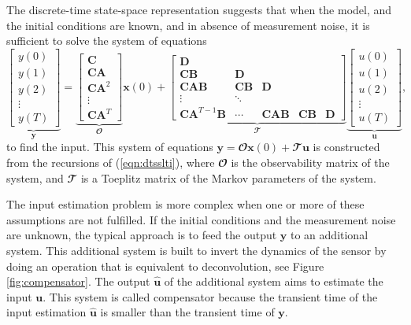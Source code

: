 The discrete-time state-space representation suggests that when the model, and the initial conditions are known, and in absence of measurement noise, it is sufficient to solve the system of equations 
\begin{equation} 
\underbrace{ \begin{bmatrix} y(0) \\ y(1) \\ y(2) \\ \vdots \\ y(T) \end{bmatrix} }_{\mathbf{y}}
 = \underbrace{ \begin{bmatrix} \mathbf{C} \\ \mathbf{C} \mathbf{A} \\ \mathbf{C} \mathbf{A}^2 \\ \vdots \\ \mathbf{C} \mathbf{A}^T \end{bmatrix} }_{\mathbfcal{O}} \mathbf{x}(0) +
 \underbrace{ \begin{bmatrix} \mathbf{D} \\ \mathbf{C} \mathbf{B} & \mathbf{D} \\ \mathbf{C} \mathbf{A} \mathbf{B} & \mathbf{C} \mathbf{B} & \mathbf{D} \\ \vdots & \ddots \\ \mathbf{C} \mathbf{A}^{T-1} \mathbf{B} & \cdots  &  \mathbf{C} \mathbf{A} \mathbf{B} & \mathbf{C} \mathbf{B} & \mathbf{D} \end{bmatrix} }_{\mathbfcal{T}} \underbrace{ \begin{bmatrix} u(0) \\ u(1) \\ u(2) \\ \vdots \\ u(T) \end{bmatrix} }_{\mathbf{u}} ,
 \label{eqn:knownmodel} \end{equation}
to find the input. 
This system of equations $\mathbf{y} = \mathbfcal{O} \mathbf{x}(0) + \mathbfcal{T} \mathbf{u}$ is constructed from the recursions of (\ref{eqn:dtsslti}), where $\mathbfcal{O}$ is the observability matrix of the system, and $\mathbfcal{T}$ is a Toeplitz matrix of the Markov parameters of the system.

The input estimation problem is more complex when one or more of these assumptions are not fulfilled.
If the initial conditions and the measurement noise are unknown, the typical approach is to feed the output $\mathbf{y}$ to an additional system.
This additional system is built to invert the dynamics of the sensor by doing an operation that is equivalent to deconvolution, see Figure \ref{fig:compensator}.
The output $\widehat{\mathbf{u}}$ of the additional system aims to estimate the input $\mathbf{u}$.
This system is called compensator because the transient time of the input estimation $\widehat{\mathbf{u}}$ is smaller than the transient time of $\mathbf{y}$.  

